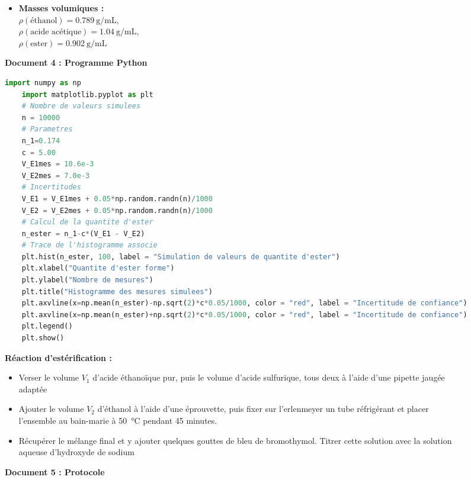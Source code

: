 \documentclass[a4paper,11pt,fleqn]{article}%
\begin{document}
\begin{figure}[h!]
\begin{minipage}{.5\linewidth}
\begin{itemize}
        \item \textbf{Masses volumiques :}\\$\rho(\text{éthanol})=\SI{0,789}{\gram\per\milli\liter}$,\\ $\rho(\text{acide acétique})=\SI{1,04}{\gram\per\milli\liter}$,\\ $\rho(\text{ester})=\SI{0,902}{\gram\per\milli\liter}$
    \end{itemize}
    \label{fig:doc4}
    \end{minipage}
\end{figure}

\begin{figure}[h!]
	
    \begin{minipage}{.5\linewidth}
    \caption*{\textbf{Document 4 : Programme Python}}
    \begin{lstlisting}[language=Python]
    	import numpy as np
	import matplotlib.pyplot as plt
	# Nombre de valeurs simulees
	n = 10000
	# Parametres
	n_1=0.174
	c = 5.00
	V_E1mes = 10.6e-3
	V_E2mes = 7.0e-3
	# Incertitudes
	V_E1 = V_E1mes + 0.05*np.random.randn(n)/1000
	V_E2 = V_E2mes + 0.05*np.random.randn(n)/1000
	# Calcul de la quantite d'ester
	n_ester = n_1-c*(V_E1 - V_E2)
	# Trace de l'histogramme associe
	plt.hist(n_ester, 100, label = "Simulation de valeurs de quantite d'ester")
	plt.xlabel("Quantite d'ester forme")
	plt.ylabel("Nombre de mesures")
	plt.title("Histogramme des mesures simulees")
	plt.axvline(x=np.mean(n_ester)-np.sqrt(2)*c*0.05/1000, color = "red", label = "Incertitude de confiance")
	plt.axvline(x=np.mean(n_ester)+np.sqrt(2)*c*0.05/1000, color = "red", label = "Incertitude de confiance")
	plt.legend()
	plt.show()
    \end{lstlisting}
    \end{minipage}
    \begin{minipage}{.5\linewidth}
    \caption*{\textbf{Document 5 : Protocole}}
    \textbf{Réaction d'estérification :}
    \begin{itemize}
        \item Verser le volume $V_1$ d'acide éthanoïque pur, puis le volume d'acide sulfurique, tous deux à l'aide d'une pipette jaugée adaptée
        \item Ajouter le volume $V_2$ d'éthanol à l'aide d'une éprouvette, puis fixer sur l'erlenmeyer un tube réfrigérant et placer l'ensemble au bain-marie à \SI{50}{\celsius} pendant 45 minutes.
        \item Récupérer le mélange final et y ajouter quelques gouttes de bleu de bromothymol. Titrer cette solution avec la solution aqueuse d'hydroxyde de sodium

\end{itemize}
\end{minipage}
\end{figure}
\end{document}
